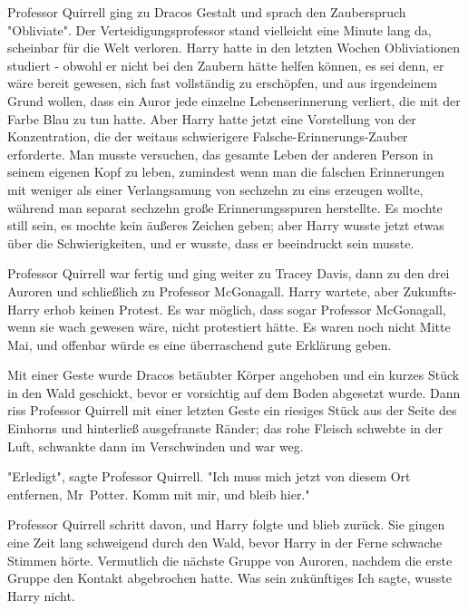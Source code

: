 {Professor Quirrell ging zu Dracos Gestalt und sprach den Zauberspruch "Obliviate". Der Verteidigungsprofessor stand vielleicht eine Minute lang da, scheinbar für die Welt verloren. Harry hatte in den letzten Wochen Obliviationen studiert - obwohl er nicht bei den Zaubern hätte helfen können, es sei denn, er wäre bereit gewesen, sich fast vollständig zu erschöpfen, und aus irgendeinem Grund wollen, dass ein Auror jede einzelne Lebenserinnerung verliert, die mit der Farbe Blau zu tun hatte. Aber Harry hatte jetzt eine Vorstellung von der Konzentration, die der weitaus schwierigere Falsche-Erinnerungs-Zauber erforderte. Man musste versuchen, das gesamte Leben der anderen Person in seinem eigenen Kopf zu leben, zumindest wenn man die falschen Erinnerungen mit weniger als einer Verlangsamung von sechzehn zu eins erzeugen wollte, während man separat sechzehn große Erinnerungsspuren herstellte. Es mochte still sein, es mochte kein äußeres Zeichen geben; aber Harry wusste jetzt etwas über die Schwierigkeiten, und er wusste, dass er beeindruckt sein musste.

Professor Quirrell war fertig und ging weiter zu Tracey Davis, dann zu den drei Auroren und schließlich zu Professor McGonagall. Harry wartete, aber Zukunfts-Harry erhob keinen Protest. Es war möglich, dass sogar Professor McGonagall, wenn sie wach gewesen wäre, nicht protestiert hätte. Es waren noch nicht Mitte Mai, und offenbar würde es eine überraschend gute Erklärung geben.

Mit einer Geste wurde Dracos betäubter Körper angehoben und ein kurzes Stück in den Wald geschickt, bevor er vorsichtig auf dem Boden abgesetzt wurde. Dann riss Professor Quirrell mit einer letzten Geste ein riesiges Stück aus der Seite des Einhorns und hinterließ ausgefranste Ränder; das rohe Fleisch schwebte in der Luft, schwankte dann im Verschwinden und war weg.

"Erledigt", sagte Professor Quirrell. "Ich muss mich jetzt von diesem Ort entfernen, Mr~Potter. Komm mit mir, und bleib hier."

Professor Quirrell schritt davon, und Harry folgte und blieb zurück. Sie gingen eine Zeit lang schweigend durch den Wald, bevor Harry in der Ferne schwache Stimmen hörte. Vermutlich die nächste Gruppe von Auroren, nachdem die erste Gruppe den Kontakt abgebrochen hatte. Was sein zukünftiges Ich sagte, wusste Harry nicht.

}
